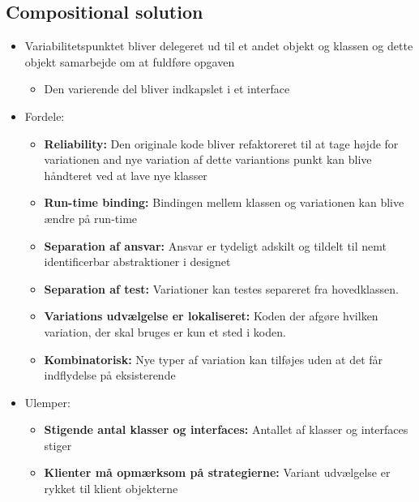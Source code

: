 \documentclass[a4, english]{article}
\begin{document}
\subsection{Compositional solution}
\begin{itemize}
	\item Variabilitetspunktet bliver delegeret ud til et andet objekt og klassen og dette objekt samarbejde om at fuldføre opgaven
  \begin{itemize}
  	\item Den varierende del bliver indkapslet i et interface 
  \end{itemize}
  \item Fordele:
  \begin{itemize}
  	\item \textbf{Reliability:} Den originale kode bliver refaktoreret til at tage højde for variationen and nye variation af dette variantions punkt kan blive håndteret ved at lave nye klasser
    \item \textbf{Run-time binding:} Bindingen mellem klassen og variationen kan blive ændre på run-time
    \item \textbf{Separation af ansvar:} Ansvar er tydeligt adskilt og tildelt til nemt identificerbar abstraktioner i designet
    \item \textbf{Separation af test:} Variationer kan testes separeret fra hovedklassen.
    \item \textbf{Variations udvælgelse er lokaliseret:} Koden der afgøre hvilken variation, der skal bruges er kun et sted i koden. 
    \item \textbf{Kombinatorisk:} Nye typer af variation kan tilføjes uden at det får indflydelse på eksisterende 
  \end{itemize}
  \item Ulemper:
  \begin{itemize}
  	\item \textbf{Stigende antal klasser og interfaces:} Antallet af klasser og interfaces stiger
    \item \textbf{Klienter må opmærksom på strategierne:} Variant udvælgelse er rykket til klient objekterne 
  \end{itemize}
\end{itemize}

\newpage
\end{document}
